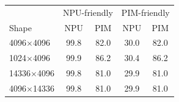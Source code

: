 \begin{tabular}{lcccc}
\toprule
 & \multicolumn{2}{c}{NPU-friendly} & \multicolumn{2}{c}{PIM-friendly} \\
Shape & NPU & PIM & NPU & PIM \\
\midrule
4096$\times$4096 & 99.8 & 82.0 & 30.0 & 82.0 \\
1024$\times$4096 & 99.9 & 86.2 & 30.4 & 86.2 \\
14336$\times$4096 & 99.8 & 81.0 & 29.9 & 81.0 \\
4096$\times$14336 & 99.8 & 81.0 & 29.9 & 81.0 \\
\bottomrule
\end{tabular}
